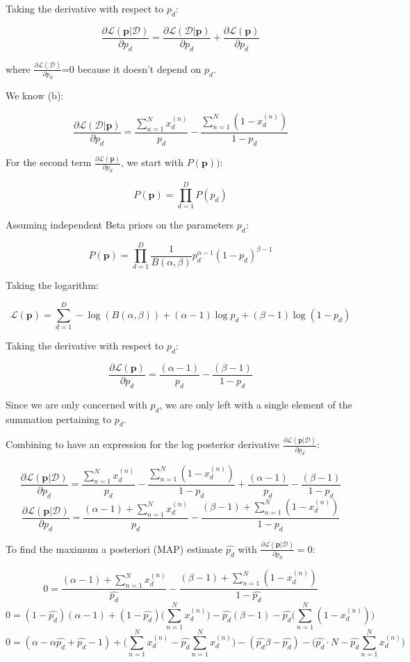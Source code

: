 \documentclass[12pt]{article}
\begin{document}
\begin{enumerate}
Taking the derivative with respect to $p_d$:

$$\frac{\partial\mathcal{L}(\textbf{p}|\mathcal{D})}{\partial p_d} = \frac{\partial\mathcal{L}(\mathcal{D}|\textbf{p})}{\partial p_d} + \frac{\partial\mathcal{L}(\textbf{p})}{\partial p_d}$$

where $\frac{\partial\mathcal{L}(\mathcal{D})}{\partial p_d}$=0 because it doesn't depend on $p_d$.

We know (b):

$$\frac{\partial\mathcal{L}(\mathcal{D}|\textbf{p})}{\partial p_d} = \frac{\sum_{n=1}^{N} x_d^{(n)}}{p_d} -  \frac{\sum_{n=1}^{N} (1-x_d^{(n)})}{1-p_d}$$

For the second term $\frac{\partial\mathcal{L}(\textbf{p})}{\partial p_d}$, we start with $P(\textbf{p}))$:

$$P(\textbf{p}) = \prod_{d=1}^D P(p_d)$$

Assuming independent Beta priors on the parameters $p_d$:

$$P(\textbf{p}) = \prod_{d=1}^D \frac{1}{B(\alpha, \beta)} p^{\alpha-1}_d (1-p_d)^{\beta-1}$$

Taking the logarithm:

$$\mathcal{L}(\textbf{p}) = \sum_{d=1}^{D} -\log (B(\alpha, \beta)) + (\alpha-1)\log p_d + (\beta-1)\log(1-p_d)$$

Taking the derivative with respect to $p_d$:

$$\frac{\partial\mathcal{L}(\textbf{p})}{\partial p_d} = \frac{(\alpha-1)}{p_d} -  \frac{(\beta-1)}{1-p_d}$$

Since we are only concerned with $p_d$, we are only left with a single element of the summation pertaining to $p_d$.


Combining to have an expression for the log posterior derivative $\frac{\partial\mathcal{L}(\textbf{p}|\mathcal{D})}{\partial p_d}$:

$$\frac{\partial\mathcal{L}(\textbf{p}|\mathcal{D})}{\partial p_d} = \frac{\sum_{n=1}^{N} x_d^{(n)}}{p_d} -  \frac{\sum_{n=1}^{N} (1-x_d^{(n)})}{1-p_d} + \frac{(\alpha-1)}{p_d} -  \frac{(\beta-1)}{1-p_d}$$
$$\frac{\partial\mathcal{L}(\textbf{p}|\mathcal{D})}{\partial p_d} = \frac{(\alpha-1) + \sum_{n=1}^{N} x_d^{(n)}}{p_d} -  \frac{(\beta-1) + \sum_{n=1}^{N} (1-x_d^{(n)})}{1-p_d}$$


To find the maximum a posteriori (MAP) estimate $\hat{p_d}$ with $\frac{\partial\mathcal{L}(\textbf{p}|\mathcal{D})}{\partial p_d} = 0$:

$$0 = \frac{(\alpha-1) + \sum_{n=1}^{N} x_d^{(n)}}{\hat{p_d}} -  \frac{(\beta-1) + \sum_{n=1}^{N} (1-x_d^{(n)})}{1-\hat{p_d}}$$
$$0 = (1-\hat{p_d})(\alpha-1) + (1-\hat{p_d})\bigg(\sum_{n=1}^{N} x_d^{(n)}\bigg) -  \hat{p_d}(\beta-1) - \hat{p_d}\bigg(\sum_{n=1}^{N} (1-x_d^{(n)})\bigg)$$
$$0 = (\alpha-\alpha \hat{p_d} + \hat{p_d} - 1) +\bigg(\sum_{n=1}^{N} x_d^{(n)} - \hat{p_d} \sum_{n=1}^{N} x_d^{(n)}\bigg) -  (\hat{p_d}\beta-\hat {p_d}) - \bigg(\hat{p_d}\cdot N - \hat{p_d}\sum_{n=1}^{N}x_d^{(n)}\bigg)$$


\end{enumerate}
\end{document}
